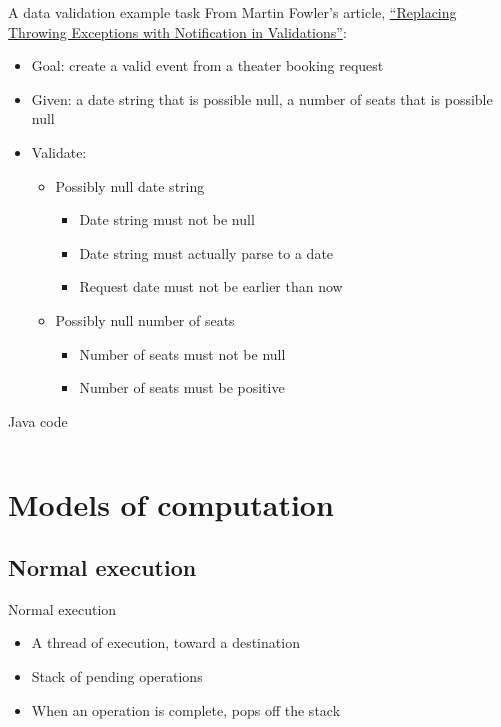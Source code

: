 \begin{frame}{A data validation example task}
  From Martin Fowler's article, \href{http://martinfowler.com/articles/replaceThrowWithNotification.html}{``Replacing Throwing Exceptions with Notification in Validations''}:
  \begin{itemize}
  \item Goal: create a valid event from a theater booking request
  \item Given: a date string that is possible null, a number of seats
    that is possible null
  \item Validate:
    \begin{itemize}
    \item Possibly null date string
      \begin{itemize}
      \item Date string must not be null
      \item Date string must actually parse to a date
      \item Request date must not be earlier than now
      \end{itemize}
    \item Possibly null number of seats
      \begin{itemize}
      \item Number of seats must not be null
      \item Number of seats must be positive
      \end{itemize}
    \end{itemize}
  \end{itemize}

\end{frame}

\begin{frame}{Java code}
  \inputminted{java}{BookingRequest.java}
\end{frame}

\section{Models of computation}

\subsection{Normal execution}

\begin{frame}{Normal execution}
  \begin{itemize}
  \item A thread of execution, toward a destination
  \item Stack of pending operations
  \item When an operation is complete, pops off the stack
  \end{itemize}
\end{frame}

